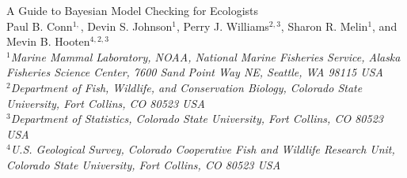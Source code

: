 \documentclass[12pt,english]{article}
\begin{document}
\begin{spacing}{1.9}


\begin{center}
  \large A Guide to Bayesian Model Checking for Ecologists
  \bigskip\\
  \normalsize {\sc Paul B. Conn$^{1,}$\footnotemark[5], Devin
    S. Johnson$^1$, Perry J. Williams$^{2,3}$, Sharon R. Melin$^1$,
    and Mevin B. Hooten$^{4,2,3}$
  }\smallskip\\
  $^1${\em Marine Mammal Laboratory, NOAA, National Marine Fisheries
    Service, Alaska Fisheries Science Center, 7600 Sand Point Way NE,
    Seattle, WA 98115 USA }\\ \medskip $^2${\em Department of Fish,
    Wildlife, and Conservation Biology, Colorado State University,
    Fort Collins, CO 80523 USA } \\ \medskip $^3${\em Department of
    Statistics, Colorado State University, Fort Collins, CO 80523 USA
  }\\ \medskip $^4${\em U.S. Geological Survey, Colorado Cooperative
    Fish and Wildlife Research Unit, Colorado State University, Fort
    Collins, CO 80523 USA }\\ \medskip
\end{center}


\raggedright \setlength{\parindent}{0.3in}
{}

\linenumbers


\end{spacing}
\end{document}
